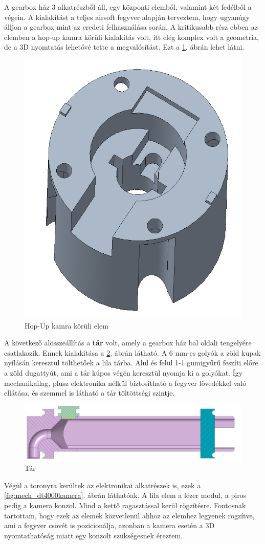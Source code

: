 \documentclass[12pt,a4paper]{article}
\begin{document}
A gearbox ház 3 alkatrészből áll, egy központi elemből, valamint két fedélből a végein. A kialakítást a teljes airsoft fegyver alapján terveztem, hogy ugyanúgy álljon a gearbox mint az eredeti felhasználása során. A kritikusabb rész ebben az elemben a hop-up kamra körüli kialakítás volt, itt elég komplex volt a geometria, de a 3D nyomtatás lehetővé tette a megvalósítást. Ezt a \ref{fig:mech_dt4200}. ábrán lehet látni.


\begin{figure}[h!]
	\centering
	\includegraphics[width=0.5\linewidth]{mech_dt4200}
	\caption{Hop-Up kamra körüli elem}
	\label{fig:mech_dt4200}
\end{figure}


A következő alösszeállítás a \textbf{tár} volt, amely a gearbox ház bal oldali tengelyére csatlakozik. Ennek kialakítása a \ref{fig:mech_tar}. ábrán látható. A 6 mm-es golyók a zöld kupak nyílásán keresztül tölthetőek a lila tárba. Alul és felül 1-1 gumigyűrű feszíti előre a zöld dugattyút, ami a tár kúpos végén keresztül nyomja ki a golyókat. Így mechanikailag, plusz elektronika nélkül biztosítható a fegyver lövedékkel való ellátása, és szemmel is látható a tár töltöttségi szintje.

\begin{figure}[h!]
	\centering
	\includegraphics[width=0.5\linewidth]{mech_tar}
	\caption{Tár}
	\label{fig:mech_tar}
\end{figure}

Végül a toronyra kerültek az elektronikai alkatrészek is, ezek a \ref{fig:mech_dt4000kamera}. ábrán láthatóak. A lila elem a lézer modul, a piros pedig a kamera konzol. Mind a kettő ragasztással kerül rögzítésre. Fontosnak tartottam, hogy ezek az elemek közvetlenül ahhoz az elemhez legyenek rögzítve, ami a fegyver csövét is pozicionálja, azonban a kamera esetén a 3D nyomtathatóság miatt egy konzolt szükségesnek éreztem.
\end{document}
